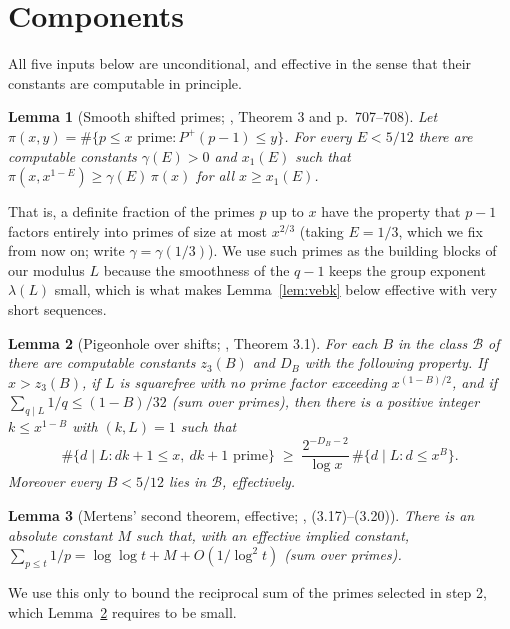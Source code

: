 \documentclass[11pt]{amsart}
\newtheorem{lemma}{Lemma}[section]
\newcommand{\llog}{\log\log}
\begin{document}
\section{Components}

All five inputs below are unconditional, and effective in the sense that
their constants are computable in principle.

\begin{lemma}[Smooth shifted primes; \cite{AGP}, Theorem 3 and p.~707--708]
\label{lem:smooth}
Let $\pi(x,y) = \#\{p \le x \text{ prime} : P^+(p-1) \le y\}$. For every
$E < 5/12$ there are computable constants $\gamma(E) > 0$ and $x_1(E)$
such that $\pi(x, x^{1-E}) \ge \gamma(E)\,\pi(x)$ for all $x \ge x_1(E)$.
\end{lemma}

That is, a definite fraction of the primes $p$ up to $x$ have the
property that $p-1$ factors entirely into primes of size at most
$x^{2/3}$ (taking $E = 1/3$, which we fix from now on; write
$\gamma = \gamma(1/3)$). We use such primes as the building blocks of
our modulus $L$ because the smoothness of the $q-1$ keeps the group
exponent $\lambda(L)$ small, which is what makes
Lemma~\ref{lem:vebk} below effective with very short sequences.

\begin{lemma}[Pigeonhole over shifts; \cite{AGP}, Theorem 3.1]
\label{lem:pigeon}
For each $B$ in the class $\mathcal{B}$ of \cite{AGP} there are computable
constants $z_3(B)$ and $D_B$ with the following property. If
$x > z_3(B)$, if $L$ is squarefree with no prime factor exceeding
$x^{(1-B)/2}$, and if $\sum_{q \mid L} 1/q \le (1-B)/32$ (sum over
primes), then there is a positive integer $k \le x^{1-B}$ with
$(k,L)=1$ such that
\[
\#\{d \mid L : dk+1 \le x,\ dk+1 \text{ prime}\}
\;\ge\; \frac{2^{-D_B-2}}{\log x}\,\#\{d \mid L : d \le x^{B}\}.
\]
Moreover every $B < 5/12$ lies in $\mathcal{B}$, effectively.
\end{lemma}

\begin{lemma}[Mertens' second theorem, effective; \cite{RS}, (3.17)--(3.20)]
\label{lem:mertens}
There is an absolute constant $M$ such that, with an effective implied
constant,
$\sum_{p \le t} 1/p = \llog t + M + O(1/\log^2 t)$ (sum over primes).
\end{lemma}

We use this only to bound the reciprocal sum of the primes selected in
step 2, which Lemma~\ref{lem:pigeon} requires to be small.
\end{document}
